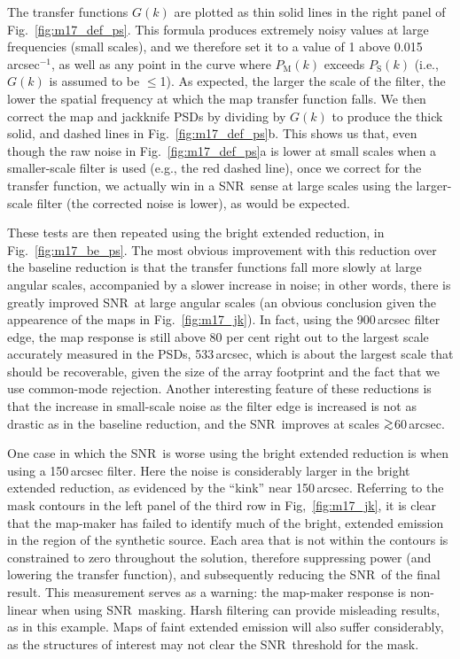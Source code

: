 \documentclass[useAMS,usenatbib,nofootinbib]{mn2e}
\newcommand{\snr}{SNR}
\def\gsim{\mathrel{\lower2.5pt\vbox{\lineskip=0pt\baselineskip=0pt
          \hbox{$>$}\hbox{$\sim$}}}}
\begin{document}
The transfer functions $G(k)$ are plotted as thin solid lines in the
right panel of Fig.~\ref{fig:m17_def_ps}. This formula produces
extremely noisy values at large frequencies (small scales), and we
therefore set it to a value of 1 above 0.015\,arcsec$^{-1}$, as well
as any point in the curve where $P_\mathrm{M}(k)$ exceeds
$P_\mathrm{S}(k)$ (i.e., $G(k)$ is assumed to be $\le$1). As expected,
the larger the scale of the filter, the lower the spatial frequency at
which the map transfer function falls. We then correct the map and
jackknife PSDs by dividing by $G(k)$ to produce the thick solid, and
dashed lines in Fig.~\ref{fig:m17_def_ps}b. This shows us that, even
though the raw noise in Fig.~\ref{fig:m17_def_ps}a is lower at small
scales when a smaller-scale filter is used (e.g., the red dashed
line), once we correct for the transfer function, we actually win in a
\snr\ sense at large scales using the larger-scale filter (the
corrected noise is lower), as would be expected.

These tests are then repeated using the bright extended reduction, in
Fig.~\ref{fig:m17_be_ps}. The most obvious improvement with this
reduction over the baseline reduction is that the transfer functions
fall more slowly at large angular scales, accompanied by a slower
increase in noise; in other words, there is greatly improved \snr\ at
large angular scales (an obvious conclusion given the appearence of
the maps in Fig.~\ref{fig:m17_jk}). In fact, using the 900\,arcsec
filter edge, the map response is still above 80 per cent right out to
the largest scale accurately measured in the PSDs, 533\,arcsec, which
is about the largest scale that should be recoverable, given the size
of the array footprint and the fact that we use common-mode rejection.
Another interesting feature of these reductions is that the increase
in small-scale noise as the filter edge is increased is not as drastic
as in the baseline reduction, and the \snr\ improves at scales
$\gsim$60\,arcsec.

One case in which the \snr\ is worse using the bright extended
reduction is when using a 150\,arcsec filter. Here the noise is
considerably larger in the bright extended reduction, as evidenced by
the ``kink'' near 150\,arcsec. Referring to the mask contours in the
left panel of the third row in Fig,~\ref{fig:m17_jk}, it is clear
that the map-maker has failed to identify much of the bright, extended
emission in the region of the synthetic source. Each area that is not
within the contours is constrained to zero throughout the solution,
therefore suppressing power (and lowering the transfer function), and
subsequently reducing the \snr\ of the final result. This measurement
serves as a warning: the map-maker response is non-linear when using
\snr\ masking. Harsh filtering can provide misleading results, as in
this example. Maps of faint extended emission will also suffer
considerably, as the structures of interest may not clear the \snr\
threshold for the mask.
\end{document}
